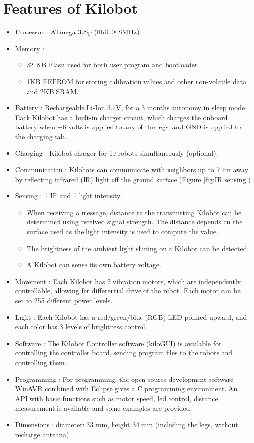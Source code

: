 \documentclass{report}[12pt]
\begin{document}
\section{Features of Kilobot}
\begin{itemize}
    \item Processor : ATmega 328p (8bit @ 8MHz) 
    \item Memory : 
    \begin{itemize}
        \item 32 KB Flash used for both user program and bootloader 
        \item 1KB EEPROM for storing calibration values and  other non-volatile data and 2KB SRAM.
    \end{itemize}
    \item Battery : Rechargeable Li-Ion  3.7V, for a 3 months autonomy in sleep mode. Each Kilobot has a built-in charger circuit, which charges the onboard battery when +6 volts is applied to any of the legs, and GND is applied to the charging tab. 
    \item Charging : Kilobot charger for 10 robots simultaneously (optional).
    \item Communication : Kilobots can communicate with neighbors up to 7 cm away by reflecting infrared (IR) light off the ground surface.(Figure \ref{fig:IR sensing})
    \item Sensing : 1 IR and 1 light intensity.
    \begin{itemize}
        \item When  receiving a message, distance to the  transmitting Kilobot can be determined using received   signal strength. The distance depends on the surface  used as the light intensity is used to compute the value.
        \item The brightness of the ambient light shining on a Kilobot can be detected. 
        \item A Kilobot can sense its own battery voltage.  
    \end{itemize}
    \item Movement :  Each Kilobot has 2 vibration motors,    which are independently controllable, allowing for differential drive of the robot. Each motor can be set to  255 different power levels.
    \item Light : Each Kilobot has a red/green/blue (RGB) LED  pointed upward, and each color has 3 levels of brightness control. 
    \item Software : The Kilobot Controller  software (kiloGUI) is available for controlling the controller  board, sending  program files to the robots and controlling them. 
    \item Programming : For programming, the open source  development software WinAVR combined with Eclipse gives a C programming environment. An API with basic functions  such as motor speed, led control, distance measurement is available and some examples are provided.
    \item Dimensions : diameter: 33 mm, height 34 mm (including the legs, without recharge antenna). 
\end{itemize}
\end{document}
